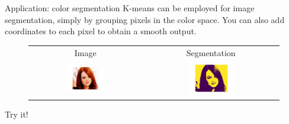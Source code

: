 \begin{frame}{Application: color segmentation}
K-means can be employed for image segmentation, simply by grouping pixels in the color space. You can also add coordinates to each pixel to obtain a smooth output.
\begin{figure}
\begin{tabular}{cc}
\small{Image} & \small{Segmentation}\\
\includegraphics[width=0.35\textwidth]{img/kmeans/emma.pdf}&
\includegraphics[width=0.35\textwidth]{img/kmeans/emma_segm.pdf}
\end{tabular}
\end{figure}
Try it!
\end{frame}